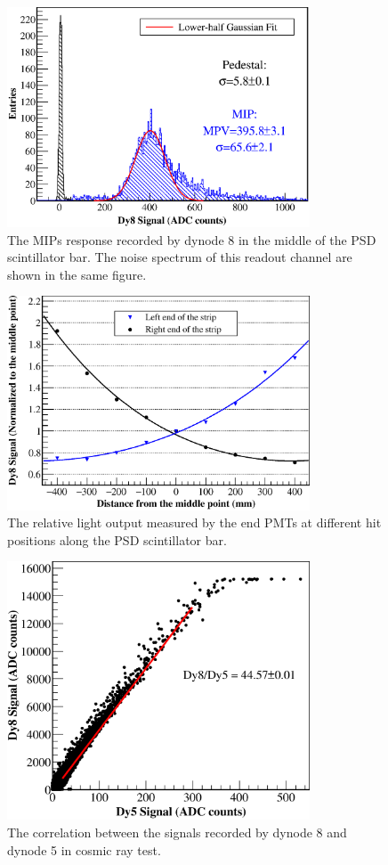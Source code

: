 \documentclass[preprint, times]{elsarticle}
\begin{document}
\begin{figure}
    \centering
    \includegraphics[width=90mm]{mip}
    \caption{The MIPs response recorded by dynode 8 in the middle of the PSD scintillator bar. The noise spectrum of this readout channel are shown in the same figure.}
    \label{fig:mip}
\end{figure}

\begin{figure}
    \centering
    \includegraphics[width=90mm]{attenuation}
    \caption{The relative light output measured by the end PMTs at different hit positions along the PSD scintillator bar.}
    \label{fig:attenuation}
\end{figure}

\begin{figure}
    \centering
    \includegraphics[width=90mm]{dy58}
    \caption{The correlation between the signals recorded by dynode 8 and dynode 5 in cosmic ray test.}
    \label{fig:dy58}
\end{figure}
\end{document}
